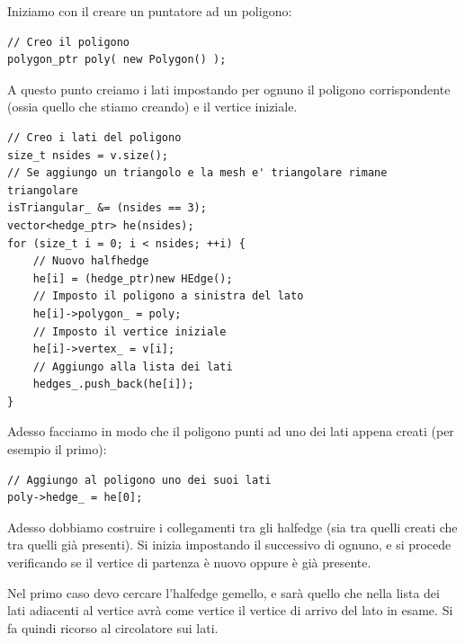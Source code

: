 Iniziamo con il creare un puntatore ad un poligono:
\begin{lstlisting}[name=addPolygon]
// Creo il poligono
polygon_ptr poly( new Polygon() );
\end{lstlisting}
A questo punto creiamo i lati impostando per ognuno il poligono corrispondente (ossia quello che stiamo creando) e il vertice iniziale.
\begin{lstlisting}[name=addPolygon]
// Creo i lati del poligono
size_t nsides = v.size();
// Se aggiungo un triangolo e la mesh e' triangolare rimane triangolare
isTriangular_ &= (nsides == 3);
vector<hedge_ptr> he(nsides);
for (size_t i = 0; i < nsides; ++i) {
    // Nuovo halfhedge
    he[i] = (hedge_ptr)new HEdge();
    // Imposto il poligono a sinistra del lato
    he[i]->polygon_ = poly;
    // Imposto il vertice iniziale
    he[i]->vertex_ = v[i];
    // Aggiungo alla lista dei lati
    hedges_.push_back(he[i]);
}
\end{lstlisting}
Adesso facciamo in modo che il poligono punti ad uno dei lati appena creati (per esempio il primo):
\begin{lstlisting}[name=addPolygon]
// Aggiungo al poligono uno dei suoi lati
poly->hedge_ = he[0];
\end{lstlisting}
Adesso dobbiamo costruire i collegamenti tra gli halfedge (sia tra quelli creati che tra quelli già presenti). Si inizia impostando il successivo di ognuno, e si procede verificando se il vertice di partenza è nuovo oppure è già presente.

Nel primo caso devo cercare l'halfedge gemello, e sarà quello che nella lista dei lati adiacenti al vertice avrà come vertice il vertice di arrivo del lato in esame. Si fa quindi ricorso al circolatore sui lati.

